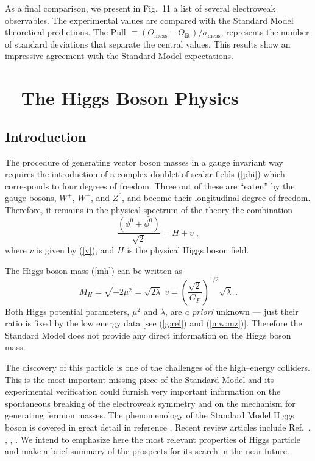\documentclass[12pt]{report}
\def\text#1{{\scriptstyle\mathrm{#1}}}
\begin{document}
\vskip 0.5cm
As a final comparison, we present in Fig.\ 11 a list of several
electroweak observables. The experimental values are compared with
the Standard Model theoretical predictions. The Pull $\equiv
(O_{\text{meas}} - O_{\text{fit}})/{\sigma_{\text{meas}}}$, 
represents the number of standard deviations that separate the
central  values. This results show an impressive agreement with the
Standard Model expectations.


\chapter{~ The Higgs Boson Physics} \label{higgs:bos} \indent


\section{Introduction}\indent

The procedure of generating vector boson masses in a gauge invariant
way requires the introduction of a complex doublet of scalar fields
(\ref{phi}) which corresponds to four degrees of freedom. Three out
of these are ``eaten'' by the gauge bosons, $W^+$, $W^-$, and $Z^0$,
and become their longitudinal degree of freedom. Therefore, it
remains in the physical spectrum of the theory the combination
\[
\frac{(\phi^0 + \bar{\phi^0} )}{\sqrt{2}} = { H + v} \; ,
\]
where $v$ is given by (\ref{v}), and $H$ is the physical Higgs boson
field. 

The Higgs boson mass (\ref{mh}) can be written as
\begin{equation}
M_H = \sqrt{- 2 { \mu^2}} = \sqrt{2 { \lambda}} \; v =
\left(\frac{\sqrt{2}}{G_F}\right)^{1/2} \sqrt{{ \lambda}} \; .
\label{mass:higgs}
\end{equation}
Both Higgs potential parameters, $\mu^2$ and $\lambda$, are {\it a
priori} unknown --- just their ratio is fixed by the low energy data
[see (\ref{g:rel}) and (\ref{mw:mz})]. Therefore the Standard Model
does not provide any direct information on the Higgs boson mass.

The discovery of this particle is one of the challenges of the
high--energy colliders. This is the most important missing piece of the
Standard Model and its experimental verification could furnish very
important information on the spontaneous breaking of the electroweak
symmetry and on the mechanism for generating fermion masses. The
phenomenology of the Standard Model Higgs boson is covered in great
detail in reference \cite{Gunion:90}. Recent review articles include
Ref.\ \cite{Kniehl:94}, \cite{Djouadi:95}, \cite{Spira:98},
\cite{Quigg:99}. We intend to emphasize here the most relevant
properties of Higgs particle and make a brief summary of the prospects
for its search in the near future.  
\end{document}
